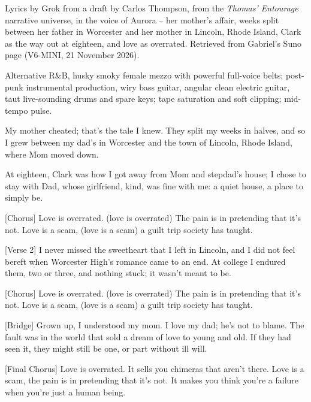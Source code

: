\begin{notes}
Lyrics by Grok from a draft by Carlos Thompson, from the \emph{Thomas' Entourage} narrative universe, in the voice of Aurora -- her mother's affair, weeks split between her father in Worcester and her mother in Lincoln, Rhode Island, Clark as the way out at eighteen, and love as overrated. Retrieved from Gabriel's Suno page (V6-MINI, 21 November 2026).
\end{notes}
\begin{style}
Alternative R\&B, husky smoky female mezzo with powerful full-voice belts; post-punk instrumental production, wiry bass guitar, angular clean electric guitar, taut live-sounding drums and spare keys; tape saturation and soft clipping; mid-tempo pulse.
\end{style}
\begin{lyrics}
[Verse 1]
My mother cheated; that's the tale I knew.
They split my weeks in halves, and so I grew
between my dad's in Worcester and the town
of Lincoln, Rhode Island, where Mom moved down.

At eighteen, Clark was how I got away
from Mom and stepdad's house; I chose to stay
with Dad, whose girlfriend, kind, was fine with me:
a quiet house, a place to simply be.

[Chorus]
Love is overrated. (love is overrated)
The pain is in pretending that it's not.
Love is a scam, (love is a scam)
a guilt trip society has taught.

[Verse 2]
I never missed the sweetheart that I left
in Lincoln, and I did not feel bereft
when Worcester High's romance came to an end.
At college I endured them, two or three,
and nothing stuck; it wasn't meant to be.

[Chorus]
Love is overrated. (love is overrated)
The pain is in pretending that it's not.
Love is a scam, (love is a scam)
a guilt trip society has taught.

[Bridge]
Grown up, I understood my mom.
I love my dad; he's not to blame.
The fault was in the world that sold
a dream of love to young and old.
If they had seen it, they might still
be one, or part without ill will.

[Final Chorus]
Love is overrated.
It sells you chimeras that aren't there.
Love is a scam,
the pain is in pretending that it's not.
It makes you think you're a failure
when you're just a human being.
\end{lyrics}

